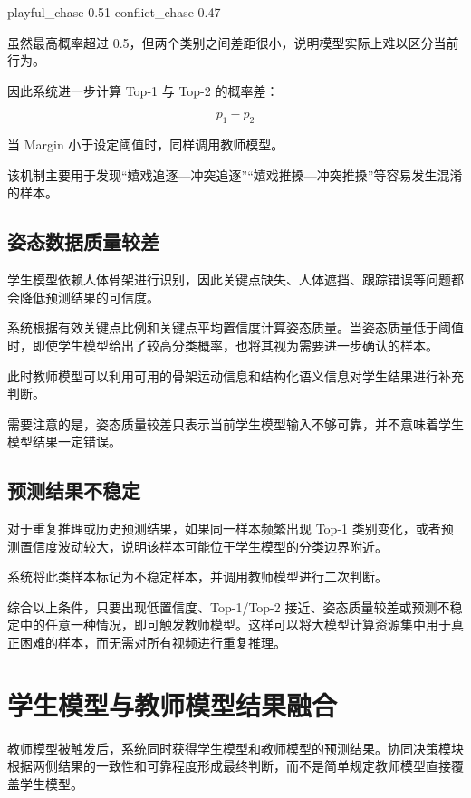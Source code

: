 \begin{NotionCode}
playful_chase     0.51
conflict_chase    0.47
\end{NotionCode}

虽然最高概率超过 0.5，但两个类别之间差距很小，说明模型实际上难以区分当前行为。

因此系统进一步计算 Top-1 与 Top-2 的概率差：

\[
p_1-p_2
\]

当 Margin 小于设定阈值时，同样调用教师模型。

该机制主要用于发现“嬉戏追逐—冲突追逐”“嬉戏推搡—冲突推搡”等容易发生混淆的样本。

\subsection{姿态数据质量较差}

学生模型依赖人体骨架进行识别，因此关键点缺失、人体遮挡、跟踪错误等问题都会降低预测结果的可信度。

系统根据有效关键点比例和关键点平均置信度计算姿态质量。当姿态质量低于阈值时，即使学生模型给出了较高分类概率，也将其视为需要进一步确认的样本。

此时教师模型可以利用可用的骨架运动信息和结构化语义信息对学生结果进行补充判断。

需要注意的是，姿态质量较差只表示当前学生模型输入不够可靠，并不意味着学生模型结果一定错误。

\subsection{预测结果不稳定}

对于重复推理或历史预测结果，如果同一样本频繁出现 Top-1 类别变化，或者预测置信度波动较大，说明该样本可能位于学生模型的分类边界附近。

系统将此类样本标记为不稳定样本，并调用教师模型进行二次判断。

综合以上条件，只要出现低置信度、Top-1/Top-2 接近、姿态质量较差或预测不稳定中的任意一种情况，即可触发教师模型。这样可以将大模型计算资源集中用于真正困难的样本，而无需对所有视频进行重复推理。


\section{学生模型与教师模型结果融合}

教师模型被触发后，系统同时获得学生模型和教师模型的预测结果。协同决策模块根据两侧结果的一致性和可靠程度形成最终判断，而不是简单规定教师模型直接覆盖学生模型。

